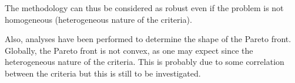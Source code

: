 The methodology can thus be considered as robust even if the problem is not homogeneous (heterogeneous nature of the criteria).

Also, analyses have been performed to determine the shape of the Pareto front. Globally, the Pareto front is not convex, as one may expect since the heterogeneous nature of the criteria. This is probably due to some correlation between the criteria but this is still to be investigated.

%





